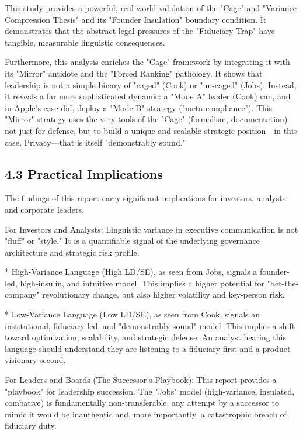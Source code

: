 \documentclass[12pt]{article}
\begin{document}
This study provides a powerful, real-world validation of the "Cage" and "Variance Compression Thesis" and its "Founder Insulation" boundary condition. It demonstrates that the abstract legal pressures of the "Fiduciary Trap" have tangible, measurable linguistic consequences.

Furthermore, this analysis enriches the "Cage" framework by integrating it with its "Mirror" antidote and the "Forced Ranking" pathology. It shows that leadership is not a simple binary of "caged" (Cook) or "un-caged" (Jobs). Instead, it reveals a far more sophisticated dynamic: a "Mode A" leader (Cook) can, and in Apple's case did, deploy a "Mode B" strategy ("meta-compliance"). This "Mirror" strategy uses the very tools of the "Cage" (formalism, documentation) not just for defense, but to build a unique and scalable strategic position—in this case, Privacy—that is itself "demonstrably sound."

\subsection{4.3 Practical Implications}

The findings of this report carry significant implications for investors, analysts, and corporate leaders.

For Investors and Analysts: Linguistic variance in executive communication is not "fluff" or "style." It is a quantifiable signal of the underlying governance architecture and strategic risk profile.

* High-Variance Language (High LD/SE), as seen from Jobs, signals a founder-led, high-insulin, and intuitive model. This implies a higher potential for "bet-the-company" revolutionary change, but also higher volatility and key-person risk.

* Low-Variance Language (Low LD/SE), as seen from Cook, signals an institutional, fiduciary-led, and "demonstrably sound" model. This implies a shift toward optimization, scalability, and strategic defense. An analyst hearing this language should understand they are listening to a fiduciary first and a product visionary second.

For Leaders and Boards (The Successor's Playbook): This report provides a "playbook" for leadership succession. The "Jobs" model (high-variance, insulated, combative) is fundamentally non-transferable; any attempt by a successor to mimic it would be inauthentic and, more importantly, a catastrophic breach of fiduciary duty.
\end{document}
